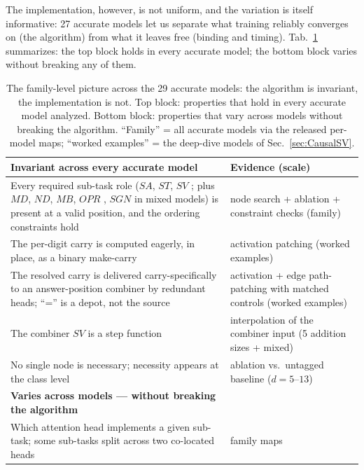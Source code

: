 \documentclass[11pt]{article}
\newcommand{\SAC}{$SA$, }
\newcommand{\STC}{$ST$, }
\newcommand{\SV}{$SV$ }
\newcommand{\OPR}{$OPR$ }
\newcommand{\SGN}{$SGN$ }
\begin{document}
The implementation, however, is not uniform, and the variation is itself informative: 27 accurate models let us separate what training
reliably converges on (the algorithm) from what it leaves free (binding and timing). Tab.~\ref{tab:FamilyInvariants} summarizes: the top
block holds in every accurate model; the bottom block varies without breaking any of them.

\begin{table}[t]
    \caption{The family-level picture across the 29 accurate models: the algorithm is invariant, the implementation is not. Top block: properties that hold in every accurate model analyzed. Bottom block: properties that vary across models without breaking the algorithm. ``Family'' = all accurate models via the released per-model maps; ``worked examples'' = the deep-dive models of Sec.~\ref{sec:CausalSV}.}
    \label{tab:FamilyInvariants}
    \vspace{0.1in}
    \centering
    \small
    \begin{tabularx}{\textwidth}{|>{\raggedright\arraybackslash}X|p{5.5cm}|}
        \hline
        \textbf{Invariant across every accurate model} & \textbf{Evidence (scale)} \\
        \hline
        Every required sub-task role (\SAC \STC \SV; plus $MD$, $ND$, $MB$, \OPR, \SGN in mixed models) is present at a valid position, and the ordering constraints hold & node search + ablation + constraint checks (family) \\
        \hline
        The per-digit carry is computed eagerly, in place, as a binary make-carry & activation patching (worked examples) \\
        \hline
        The resolved carry is delivered carry-specifically to an answer-position combiner by redundant heads; ``='' is a depot, not the source & activation + edge path-patching with matched controls (worked examples) \\
        \hline
        The combiner \SV is a step function & interpolation of the combiner input (5 addition sizes + mixed) \\
        \hline
        No single node is necessary; necessity appears at the class level & ablation vs.\ untagged baseline ($d{=}5$--$13$) \\
        \hline 
        \textbf{Varies across models --- without breaking the algorithm} & \\
        \hline
        Which attention head implements a given sub-task; some sub-tasks split across two co-located heads & family maps \\

\end{tabularx}
\end{table}
\end{document}
